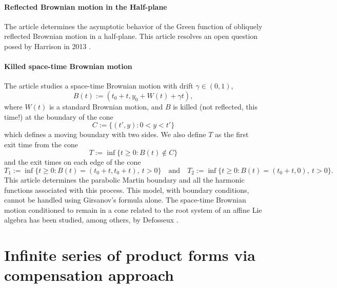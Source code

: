 \documentclass[11pt]{article}
\newcommand\citeS[1]{\cite{#1}}
\theoremstyle{definition}
\begin{document}
\paragraph{Reflected Brownian motion in the Half-plane}

The article \citeS{franceschi_ernst_asymptotic_2021} determines the asymptotic behavior of the Green function of obliquely reflected Brownian motion in a half-plane. This article resolves an open question posed by Harrison in 2013 \cite{Web}. 

\paragraph{Killed space-time Brownian motion}

The article \cite{franceschi_spacetime_2024} studies a space-time Brownian motion with drift $\gamma\in (0,1)$,
\begin{equation}
B(t):=(t_0+t,y_0+W(t)+\gamma t),
\label{eq:B}
\end{equation}
where $W(t)$ is a standard Brownian motion, and $B$ is
killed (not reflected, this time!) at the boundary of the cone 
\begin{equation}
C:= \{ (t',y): 0<y<t' \}
\label{eq:C}
\end{equation}
which defines a moving boundary with two sides. We also define $T$ as the first exit time from the cone
\begin{equation}
T:=\inf \{t\geqslant 0 : B(t)\notin C \}
\label{eq:T}
\end{equation}
and the exit times on each edge of the cone
\begin{equation}
T_1:=\inf \{ t\geqslant 0 : B(t)=(t_0+t,t_0+t) , \ t>0 \}
\quad\text{and}\quad
T_2:=\inf \{ t\geqslant 0 : B(t)=(t_0+t,0) , \ t>0 \} .
\label{eq:T1T2}
\end{equation}
This article determines the parabolic Martin boundary and all the harmonic functions associated with this process. 
This model, with boundary conditions, cannot be handled using Girsanov's formula alone. The space-time Brownian motion conditioned to remain in a cone related to the root system of an affine Lie algebra has been studied, among others, by Defosseux \cite{Defosseux2016}.

\section{Infinite series of product forms via compensation approach}
\label{sec:compa}
\end{document}
